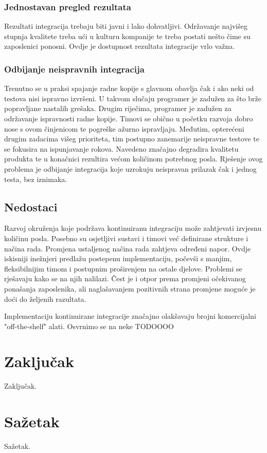 \documentclass[times, utf8, seminar, numeric]{fer}
\begin{document}
\subsection{Jednostavan pregled rezultata}
Rezultati integracija trebaju biti javni i lako dohvatljivi. Održavanje najvišeg stupnja kvalitete treba ući u kulturu kompanije te treba postati nešto čime su zaposlenici ponosni. Ovdje je dostupnost rezultata integracije vrlo važna.

\subsection{Odbijanje neispravnih integracija}
Trenutno se u praksi spajanje radne kopije s glavnom obavlja čak i ako neki od testova nisi ispravno izvršeni. U takvom slučaju programer je zadužen za što brže popravljane nastalih grešaka. Drugim riječima, programer je zadužen za održavanje ispravnosti radne kopije. Timovi se obično u početku razvoja dobro nose s ovom činjenicom te pogreške ažurno ispravljaju. Međutim, opterećeni drugim zadacima višeg prioriteta, tim postupno zanemarije  neispravne testove te se fokusira na ispunjavanje rokova\citep{web:CIDoesNotWork}. Navedeno značajno degradira kvalitetu produkta te u konačnici rezultira većom količinom potrebnog posla. Rješenje ovog problema je odbijanje integracija koje uzrokuju neispravan prilazak čak i jednog testa, bez iznimaka\citep{web:CIDead}.

\section{Nedostaci}
Razvoj okruženja koje podržava kontinuiranu integraciju može zahtjevati izvjesnu količinu posla. Posebno su osjetljivi sustavi i timovi već definirane strukture i načina rada. Promjena ustaljenog načina rada zahtjeva određeni napor. Ovdje iskisniji inežnjeri predlažu postepenu implementaciju, počevši s manjim, fleksibilnijim timom i postupnim proširenjem na ostale djelove. Problemi se rješavaju kako se na njih nalilazi. Čest je i otpor prema promjeni očekivanog ponašanja zaposlenika, ali naglašavanjem pozitivnih strana promjene moguće je doći do željenih razultata.

Implementaciju kontinuirane integracije značajno olakšavaju brojni komercijalni "off-the-shelf" alati. Osvrnimo se na neke TODOOOO


\chapter{Zaključak}
Zaključak.




\chapter{Sažetak}
Sažetak.
\end{document}
